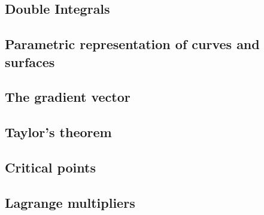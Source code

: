 \subsection{Double Integrals}
\subsection{Parametric representation of curves and surfaces}
\subsection{The gradient vector}
\subsection{Taylor's theorem}
\subsection{Critical points}
\subsection{Lagrange multipliers}
